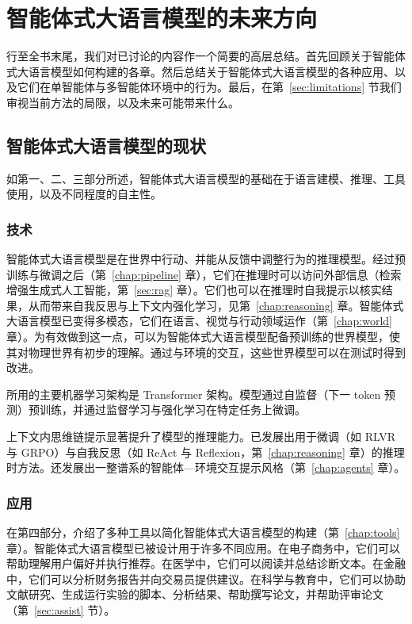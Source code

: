\chapter{智能体式大语言模型的未来方向}\label{chap:concl}


行至全书末尾，我们对已讨论的内容作一个简要的高层总结。首先回顾关于智能体式大语言模型如何构建的各章。然后总结关于智能体式大语言模型的各种应用、以及它们在单智能体与多智能体环境中的行为。最后，在第~\ref{sec:limitations} 节我们审视当前方法的局限，以及未来可能带来什么。

\section{智能体式大语言模型的现状}
如第一、二、三部分所述，智能体式大语言模型的基础在于语言建模、推理、工具使用，以及不同程度的自主性。

\subsection{技术} 
智能体式大语言模型是在世界中行动、并能从反馈中调整行为的推理模型。经过预训练与微调之后（第~\ref{chap:pipeline} 章），它们在推理时可以访问外部信息（检索增强生成式人工智能，第~\ref{sec:rag} 章）。它们也可以在推理时自我提示以核实结果，从而带来自我反思与上下文内强化学习，见第~\ref{chap:reasoning} 章。智能体式大语言模型已变得多模态，它们在语言、视觉与行动领域运作（第~\ref{chap:world} 章）。为有效做到这一点，可以为智能体式大语言模型配备预训练的世界模型，使其对物理世界有初步的理解。通过与环境的交互，这些世界模型可以在测试时得到改进。

所用的主要机器学习架构是 Transformer 架构。模型通过自监督（下一 token 预测）预训练，并通过监督学习与强化学习在特定任务上微调。

上下文内思维链提示显著提升了模型的推理能力。已发展出用于微调（如 RLVR 与 GRPO）与自我反思（如 ReAct 与 Reflexion，第~\ref{chap:reasoning} 章）的推理时方法。还发展出一整谱系的智能体—环境交互提示风格（第~\ref{chap:agents} 章）。

\subsection{应用}
在第四部分，介绍了多种工具以简化智能体式大语言模型的构建（第~\ref{chap:tools} 章）。智能体式大语言模型已被设计用于许多不同应用。在电子商务中，它们可以帮助理解用户偏好并执行推荐。在医学中，它们可以阅读并总结诊断文本。在金融中，它们可以分析财务报告并向交易员提供建议。在科学与教育中，它们可以协助文献研究、生成运行实验的脚本、分析结果、帮助撰写论文，并帮助评审论文（第~\ref{sec:assist} 节）。

